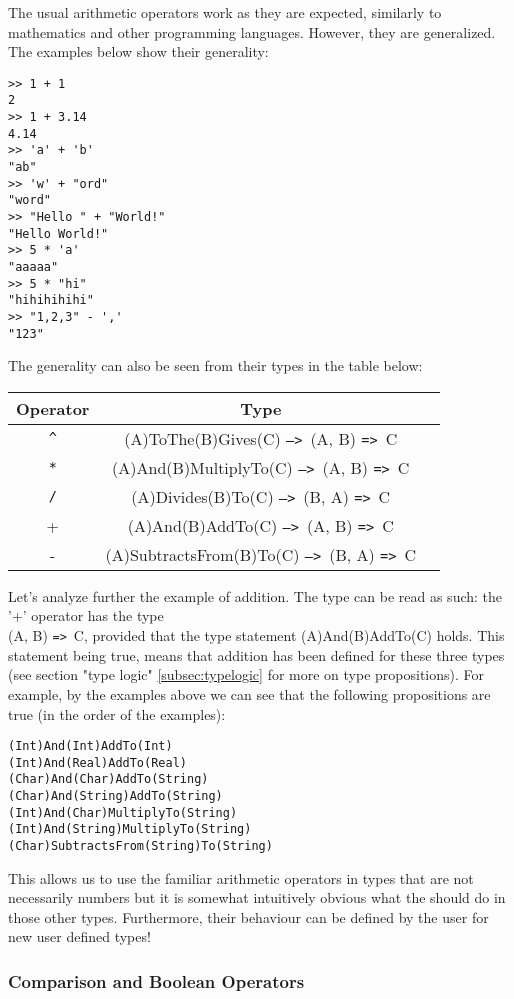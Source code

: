 \documentclass{article}
\def\ra{\texttt{=>}\ }
\def\Ra{\texttt{-->}\ }
\begin{document}
The usual arithmetic operators work as they are expected, similarly to mathematics
and other programming languages. However, they are generalized. The examples below 
show their generality:
\begin{verbatim}
>> 1 + 1
2
>> 1 + 3.14
4.14
>> 'a' + 'b'
"ab"
>> 'w' + "ord"
"word"
>> "Hello " + "World!"
"Hello World!"
>> 5 * 'a'
"aaaaa"
>> 5 * "hi"
"hihihihihi"
>> "1,2,3" - ','
"123"
\end{verbatim}
The generality can also be seen from their types in the table below:
\begin{center}
\begin{tabular}{ |c|c|c| } 
\hline
Operator & Type \\ 
\hline
\hline
\texttt{\^} & (A)ToThe(B)Gives(C) \Ra (A, B) \ra C \\
\hline
\texttt{*} & (A)And(B)MultiplyTo(C) \Ra (A, B) \ra C \\
\hline
\texttt{/} & (A)Divides(B)To(C) \Ra (B, A) \ra C \\
\hline
+ & (A)And(B)AddTo(C) \Ra (A, B) \ra C \\ 
\hline
- & (A)SubtractsFrom(B)To(C) \Ra (B, A) \ra C \\
\hline
\end{tabular}
\end{center}
Let's analyze further the example of addition. The type can be read as such:
the '+' operator has the type \\ (A, B) \ra C, provided that the type
statement (A)And(B)AddTo(C) holds. This statement being true, means that
addition has been defined for these three types (see section "type logic"
\ref{subsec:typelogic} for more on type propositions). For example, by the examples
above we can see that the following propositions are true (in the order of the 
examples):
\begin{verbatim}
(Int)And(Int)AddTo(Int)
(Int)And(Real)AddTo(Real)
(Char)And(Char)AddTo(String)
(Char)And(String)AddTo(String)
(Int)And(Char)MultiplyTo(String)
(Int)And(String)MultiplyTo(String)
(Char)SubtractsFrom(String)To(String)
\end{verbatim}
This allows us to use the familiar arithmetic operators in types that are not
necessarily numbers but it is somewhat intuitively obvious what the should do
in those other types. Furthermore, their behaviour can be defined by the user
for new user defined types!

\subsubsection{Comparison and Boolean Operators}
\end{document}
